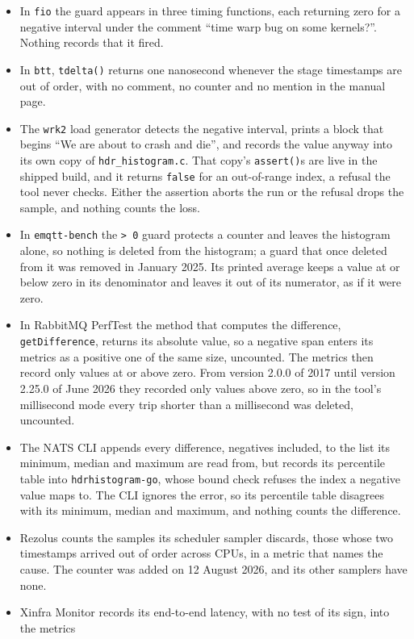\documentclass[10pt,journal,onecolumn]{IEEEtran}
\begin{document}
\begin{itemize}
\item In \texttt{fio} the guard appears in three timing functions, each returning zero for a
negative interval under the comment ``time warp bug on some kernels?''. Nothing records that it
fired.
\item In \texttt{btt}, \texttt{tdelta()} returns one nanosecond whenever the stage timestamps
are out of order, with no comment, no counter and no mention in the manual page.
\item The \texttt{wrk2} load generator detects the negative interval, prints a block that begins
``We are about to crash and die'', and records the value anyway into its own copy of
\texttt{hdr\_histogram.c}. That copy's \texttt{assert()}s are live in the shipped build, and it
returns \texttt{false} for an out-of-range index, a refusal the tool never checks. Either the
assertion aborts the run or the refusal drops the sample, and nothing counts the loss.
\item In \texttt{emqtt-bench} the \texttt{> 0} guard protects a counter and leaves the histogram
alone, so nothing is deleted from the histogram; a guard that once deleted from it was removed
in January 2025.
Its printed average keeps a value at or below zero in its denominator and leaves it out of its
numerator, as if it were zero.
\item In RabbitMQ PerfTest the method that computes the difference, \texttt{getDifference},
returns its absolute value, so a negative span enters its metrics as a positive one of the same
size, uncounted. The metrics then record only values at or above zero. From version 2.0.0 of
2017 until version 2.25.0 of June 2026 they recorded only values above zero, so in the tool's
millisecond mode every trip shorter than a millisecond was deleted, uncounted.
\item The NATS CLI appends every difference, negatives included, to the list its minimum, median
and maximum are read from, but records its percentile table into \texttt{hdrhistogram-go}, whose
bound check refuses the index a negative value maps to. The CLI ignores the error, so its
percentile table disagrees with its minimum, median and maximum, and nothing counts the
difference.
\item Rezolus counts the samples its scheduler sampler discards, those whose two timestamps
arrived out of order across CPUs, in a metric that names the cause. The counter was added on 12
August 2026, and its other samplers have none.
\item Xinfra Monitor records its end-to-end latency, with no test of its sign, into the metrics

\end{itemize}
\end{document}
